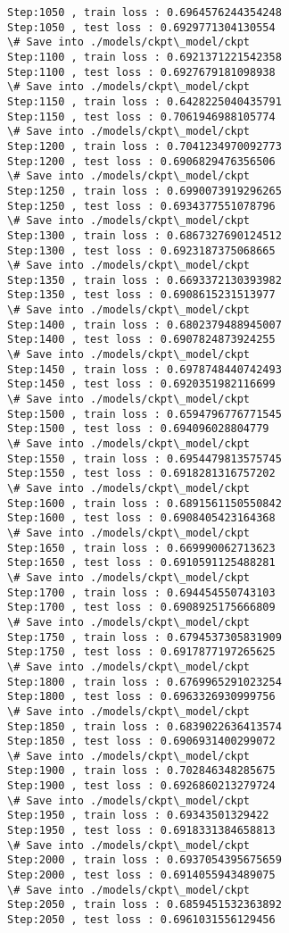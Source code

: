 \documentclass[11pt]{article}
\begin{document}
\begin{Verbatim}[commandchars=\\\{\}]
Step:1050 , train loss : 0.6964576244354248
Step:1050 , test loss : 0.6929771304130554
\# Save into ./models/ckpt\_model/ckpt
Step:1100 , train loss : 0.6921371221542358
Step:1100 , test loss : 0.6927679181098938
\# Save into ./models/ckpt\_model/ckpt
Step:1150 , train loss : 0.6428225040435791
Step:1150 , test loss : 0.7061946988105774
\# Save into ./models/ckpt\_model/ckpt
Step:1200 , train loss : 0.7041234970092773
Step:1200 , test loss : 0.6906829476356506
\# Save into ./models/ckpt\_model/ckpt
Step:1250 , train loss : 0.6990073919296265
Step:1250 , test loss : 0.6934377551078796
\# Save into ./models/ckpt\_model/ckpt
Step:1300 , train loss : 0.6867327690124512
Step:1300 , test loss : 0.6923187375068665
\# Save into ./models/ckpt\_model/ckpt
Step:1350 , train loss : 0.6693372130393982
Step:1350 , test loss : 0.6908615231513977
\# Save into ./models/ckpt\_model/ckpt
Step:1400 , train loss : 0.6802379488945007
Step:1400 , test loss : 0.6907824873924255
\# Save into ./models/ckpt\_model/ckpt
Step:1450 , train loss : 0.6978748440742493
Step:1450 , test loss : 0.6920351982116699
\# Save into ./models/ckpt\_model/ckpt
Step:1500 , train loss : 0.6594796776771545
Step:1500 , test loss : 0.694096028804779
\# Save into ./models/ckpt\_model/ckpt
Step:1550 , train loss : 0.6954479813575745
Step:1550 , test loss : 0.6918281316757202
\# Save into ./models/ckpt\_model/ckpt
Step:1600 , train loss : 0.6891561150550842
Step:1600 , test loss : 0.6908405423164368
\# Save into ./models/ckpt\_model/ckpt
Step:1650 , train loss : 0.669990062713623
Step:1650 , test loss : 0.6910591125488281
\# Save into ./models/ckpt\_model/ckpt
Step:1700 , train loss : 0.694454550743103
Step:1700 , test loss : 0.6908925175666809
\# Save into ./models/ckpt\_model/ckpt
Step:1750 , train loss : 0.6794537305831909
Step:1750 , test loss : 0.6917877197265625
\# Save into ./models/ckpt\_model/ckpt
Step:1800 , train loss : 0.6769965291023254
Step:1800 , test loss : 0.6963326930999756
\# Save into ./models/ckpt\_model/ckpt
Step:1850 , train loss : 0.6839022636413574
Step:1850 , test loss : 0.6906931400299072
\# Save into ./models/ckpt\_model/ckpt
Step:1900 , train loss : 0.702846348285675
Step:1900 , test loss : 0.6926860213279724
\# Save into ./models/ckpt\_model/ckpt
Step:1950 , train loss : 0.69343501329422
Step:1950 , test loss : 0.6918331384658813
\# Save into ./models/ckpt\_model/ckpt
Step:2000 , train loss : 0.6937054395675659
Step:2000 , test loss : 0.6914055943489075
\# Save into ./models/ckpt\_model/ckpt
Step:2050 , train loss : 0.6859451532363892
Step:2050 , test loss : 0.6961031556129456

\end{Verbatim}
\end{document}
